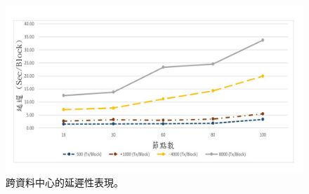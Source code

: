 \begin{figure}[htp]
\centering
\includegraphics[scale=0.5]{images/64.jpg}
\caption{跨資料中心的延遲性表現。}
\label{i:byz-latency}
\end{figure}
